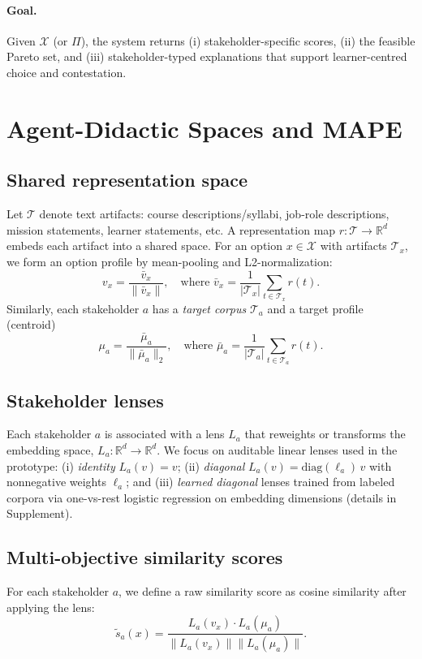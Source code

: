 \documentclass[sigconf,review]{acmart}
\newcommand{\MAPE}{\textsc{MAPE}\xspace}
\begin{document}
\paragraph{Goal.}
Given $\mathcal{X}$ (or $\Pi$), the system returns (i) stakeholder-specific scores, (ii) the feasible Pareto set, and (iii) stakeholder-typed explanations that support learner-centred choice and contestation.

\section{Agent-Didactic Spaces and \MAPE}
\label{sec:method}
\subsection{Shared representation space}
Let $\mathcal{T}$ denote text artifacts: course descriptions/syllabi, job-role descriptions, mission statements, learner statements, etc. A representation map  $r:\mathcal{T}\to\mathbb{R}^d$ embeds each artifact into a shared space. For an option $x\in\mathcal{X}$ with artifacts $\mathcal{T}_x$, we form an option profile by mean-pooling and L2-normalization:
\begin{equation}
  v_x = \frac{\bar{v}_x}{\|\bar{v}_x\|}, \quad \text{where } \bar{v}_x = \frac{1}{|\mathcal{T}_x|}\sum_{t\in\mathcal{T}_x} r(t).
\end{equation}
Similarly, each stakeholder $a$ has a \emph{target corpus} $\mathcal{T}_a$ and a target profile (centroid)
\begin{equation}
  \mu_a = \frac{\bar{\mu}_a}{\|\bar{\mu}_a\|_2}, \quad \text{where } \bar{\mu}_a = \frac{1}{|\mathcal{T}_a|}\sum_{t\in\mathcal{T}_a} r(t).
\end{equation}

\subsection{Stakeholder lenses}
Each stakeholder $a$ is associated with a lens $L_a$ that reweights or transforms the embedding space, $L_a:\mathbb{R}^d \to \mathbb{R}^d.$
We focus on auditable linear lenses used in the prototype:
(i) \emph{identity} $L_a(v)=v$;
(ii) \emph{diagonal} $L_a(v)=\mathrm{diag}(\ell_a)\,v$ with nonnegative weights $\ell_a$; and
(iii) \emph{learned diagonal} lenses trained from labeled corpora via one-vs-rest logistic regression on embedding dimensions (details in Supplement).

\subsection{Multi-objective similarity scores}
\label{subsec:scores}
For each stakeholder $a$, we define a raw similarity score as cosine similarity after applying the lens:
\begin{equation}
  \tilde{s}_a(x) = \frac{L_a(v_x) \cdot L_a(\mu_a)}{\|L_a(v_x)\| \|L_a(\mu_a)\|}.
\end{equation}
\end{document}
